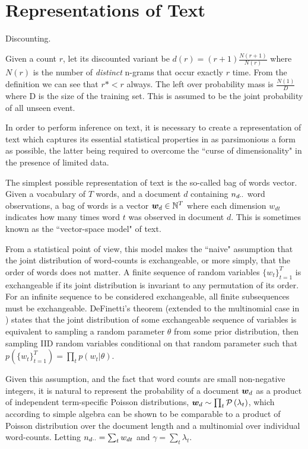 

\section{Representations of Text}
Discounting.

Given a count $r$, let its discounted variant be $d(r) = (r+1) \frac{N(r+1)}{N(r)}$ where $N(r)$ is the number of \emph{distinct} n-grams that occur exactly $r$ time. From the definition we can see that $r* < r$ always. The left over probability mass is $\frac{N(1)}{D}$ where D is the size of the training set. This is assumed to be the joint probability of all unseen event.


In order to perform inference on text, it is necessary to create a representation of text which captures its essential statistical properties in as parsimonious a form as possible, the latter being required to overcome the ``curse of dimensionality"\cite{Bishop2006} in the presence of limited data.

The simplest possible representation of text is the so-called bag of words vector. Given a vocabulary of $T$ words, and a document $d$ containing ${ n_{d\cdot\cdot} }$ word observations, a bag of words is a vector $\bm w_d \in { \mathbb{N}^{T} }$ where each dimension $w_{dt}$ indicates how many times word $t$ was observed in document $d$. This is sometimes known as the ``vector-space model"\cite{Jst2004} of text. 

From a statistical point of view, this model makes the ``naive" assumption that the joint distribution of word-counts is exchangeable, or more simply, that the order of words does not matter. A finite sequence of random variables $\{w_t\}_{t=1}^{T}$ is exchangeable if its joint distribution is invariant to any permutation of its order. For an infinite sequence to be considered exchangeable, all finite subsequences must be exchangeable. DeFinetti's theorem (extended to the multinomial case in \cite{Hewitt1955}) states that the joint distribution of some exchangeable sequence of variables is equivalent to sampling a random parameter $\theta$ from some prior distribution, then sampling IID random variables conditional on that random parameter such that $p\left(\{w_t\}_{t=1}^{T}\right) = \prod_t p(w_t | \theta)$.

Given this assumption, and the fact that word counts are small non-negative integers, it is natural to represent the probability of a document ${ \bm w_d }$ as a product of independent term-specific Poisson distributions, ${ \bm w_d } \sim \prod_t \mathcal{P} \left( {\lambda_t} \right)$, which according to simple algebra can be shown to be comparable to a product of Poisson distribution over the document length and a multinomial over individual word-counts. Letting ${ n_{d\cdot\cdot} } = \sum_t { w_{dt} }$ and $\gamma = \sum_t \lambda_t$.

